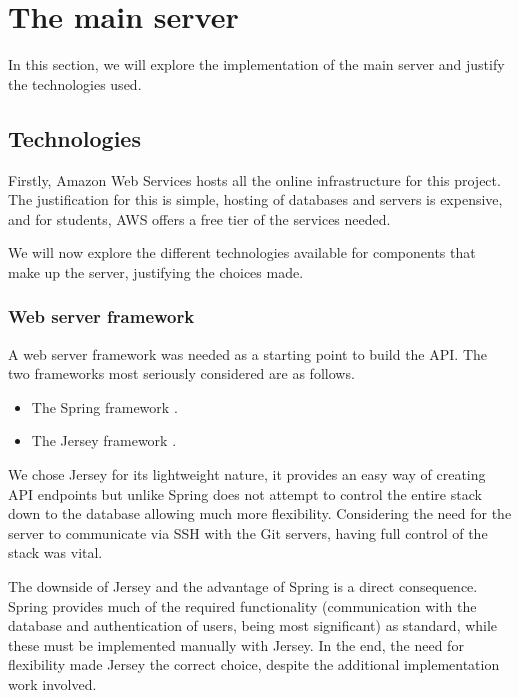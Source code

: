 
\section{The main server}

In this section, we will explore the implementation of the main server and justify the technologies used.

\subsection{Technologies}\label{sec:technologies}

Firstly, Amazon Web Services hosts all the online infrastructure for this project. The justification for this is simple, hosting of databases and servers is expensive, and for students, AWS offers a free tier of the services needed.

We will now explore the different technologies available for components that make up the server, justifying the choices made.


\subsubsection{Web server framework}

A web server framework was needed as a starting point to build the API. The two frameworks most seriously considered are as follows.

\begin{itemize}
\item The Spring framework \cite{spring}.
\item The Jersey framework \cite{jersey}.
\end{itemize}

We chose Jersey for its lightweight nature, it provides an easy way of creating API endpoints but unlike Spring does not attempt to control the entire stack down to the database allowing much more flexibility. Considering the need for the server to communicate via SSH with the Git servers, having full control of the stack was vital.

The downside of Jersey and the advantage of Spring is a direct consequence. Spring provides much of the required functionality (communication with the database and authentication of users, being most significant) as standard, while these must be implemented manually with Jersey. In the end, the need for flexibility made Jersey the correct choice, despite the additional implementation work involved.

